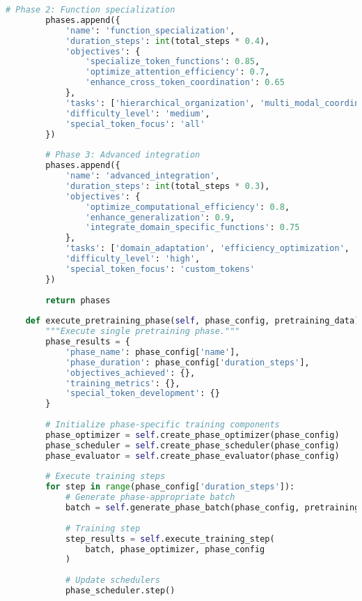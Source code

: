 \begin{lstlisting}[language=Python, caption=Progressive curriculum framework for special token pretraining]
        # Phase 2: Function specialization
        phases.append({
            'name': 'function_specialization',
            'duration_steps': int(total_steps * 0.4),
            'objectives': {
                'specialize_token_functions': 0.85,
                'optimize_attention_efficiency': 0.7,
                'enhance_cross_token_coordination': 0.65
            },
            'tasks': ['hierarchical_organization', 'multi_modal_coordination', 'complex_aggregation'],
            'difficulty_level': 'medium',
            'special_token_focus': 'all'
        })
        
        # Phase 3: Advanced integration
        phases.append({
            'name': 'advanced_integration',
            'duration_steps': int(total_steps * 0.3),
            'objectives': {
                'optimize_computational_efficiency': 0.8,
                'enhance_generalization': 0.9,
                'integrate_domain_specific_functions': 0.75
            },
            'tasks': ['domain_adaptation', 'efficiency_optimization', 'complex_reasoning'],
            'difficulty_level': 'high',
            'special_token_focus': 'custom_tokens'
        })
        
        return phases
    
    def execute_pretraining_phase(self, phase_config, pretraining_data):
        """Execute single pretraining phase."""
        phase_results = {
            'phase_name': phase_config['name'],
            'phase_duration': phase_config['duration_steps'],
            'objectives_achieved': {},
            'training_metrics': {},
            'special_token_development': {}
        }
        
        # Initialize phase-specific training components
        phase_optimizer = self.create_phase_optimizer(phase_config)
        phase_scheduler = self.create_phase_scheduler(phase_config)
        phase_evaluator = self.create_phase_evaluator(phase_config)
        
        # Execute training steps
        for step in range(phase_config['duration_steps']):
            # Generate phase-appropriate batch
            batch = self.generate_phase_batch(phase_config, pretraining_data)
            
            # Training step
            step_results = self.execute_training_step(
                batch, phase_optimizer, phase_config
            )
            
            # Update schedulers
            phase_scheduler.step()
            

\end{lstlisting}

